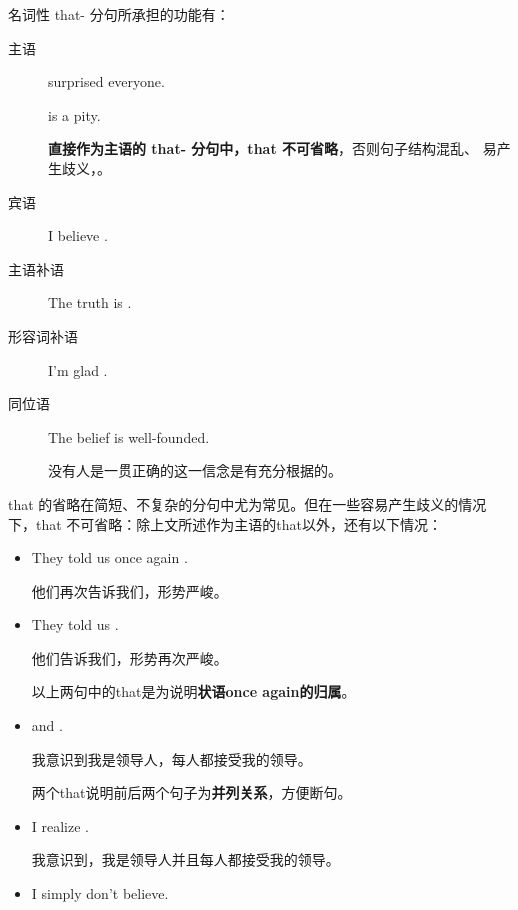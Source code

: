 名词性 that- 分句所承担的功能有：
\begin{description}
\item[主语]  surprised everyone.

   is a pity.

  \textbf{直接作为主语的 that- 分句中，that 不可省略}，否则句子结构混乱、
  易产生歧义，。

\item[宾语] I believe .
\item[主语补语] The truth is .
\item[形容词补语] I'm glad .

\item[同位语] The belief  is well-founded.

  没有人是一贯正确的这一信念是有充分根据的。
\end{description}

that 的省略在简短、不复杂的分句中尤为常见。但在一些容易产生歧义的情况
下，that 不可省略：除上文所述作为主语的that以外，还有以下情况：
\begin{itemize}
\item  They told us once again .

  他们再次告诉我们，形势严峻。

\item They told us .

  他们告诉我们，形势再次严峻。

  以上两句中的that是为说明\textbf{状语once again的归属}。

\item {} and .

  我意识到我是领导人，每人都接受我的领导。

  两个that说明前后两个句子为\textbf{并列关系}，方便断句。

\item I realize .

  我意识到，我是领导人并且每人都接受我的领导。

\item {} I simply don't believe.

\end{itemize}

